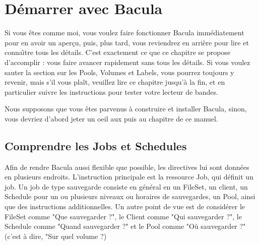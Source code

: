 
\chapter{D\'emarrer avec Bacula}
\label{_ChapterStart37}

Si vous \^etes comme moi, vous voulez faire fonctionner Bacula imm\'ediatement
pour en avoir un aper\c{c}u, puis, plus tard, vous reviendrez en arri\`ere
pour lire et conna{\^\i}tre tous les d\'etails. C'est exactement ce que ce
chapitre se propose d'accomplir : vous faire avancer rapidement sans tous les
d\'etails. Si vous voulez sauter la section sur les Pools, Volumes et Labels,
vous pourrez toujours y revenir, mais s'il vous pla\^it, veuillez lire ce
chapitre jusqu'\`a la fin, et en particulier suivre les instructions pour
tester votre lecteur de bandes. 

Nous supposons que vous \^etes parvenus \`a construire et installer Bacula,
sinon, vous devriez d'abord jeter un oeil aux 
 puis au chapitre 
 de ce manuel. 

\label{JobsandSchedules}
\section{Comprendre les Jobs et Schedules}

Afin de rendre Bacula aussi flexible que possible, les directives lui sont 
donn\'ees en plusieurs endroits. L'instruction principale est la ressource Job, 
qui d\'efinit un job. Un job de type sauvegarde consiste en g\'en\'eral en un 
FileSet, un client, un Schedule pour un ou plusieurs niveaux ou horaires de sauvegardes, 
un Pool, ainsi que des instructions additionnelles. Un autre point de vue 
est de consid\'erer le FileSet comme "Que sauvegarder ?", le Client comme 
"Qui sauvegarder ?", le Schedule comme "Quand sauvegarder ?" et le Pool 
comme "O\`u sauvegarder ?" (c'est \`a dire, "Sur quel volume ?)

